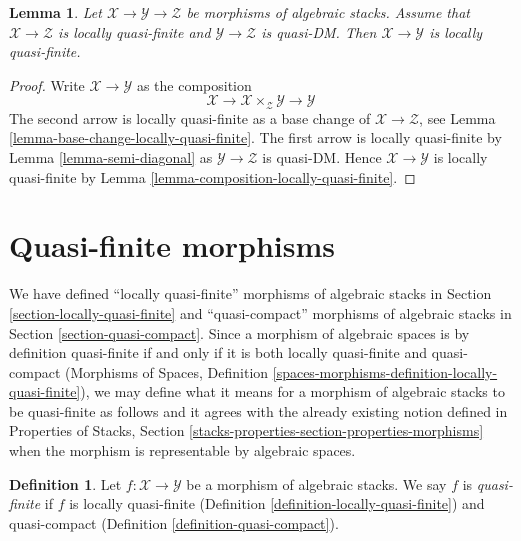 \documentclass{stacks-project}
\newenvironment{reference}{\comment}{\endcomment}
\theoremstyle{plain}
\newtheorem{lemma}[subsection]{Lemma}
\theoremstyle{definition}
\newtheorem{definition}[subsection]{Definition}
\theoremstyle{remark}
\numberwithin{equation}{subsection}
\begin{document}
\begin{lemma}
\label{lemma-locally-quasi-finite-permanence}
Let $\mathcal{X} \to \mathcal{Y} \to \mathcal{Z}$ be morphisms
of algebraic stacks. Assume that $\mathcal{X} \to \mathcal{Z}$
is locally quasi-finite and $\mathcal{Y} \to \mathcal{Z}$ is quasi-DM.
Then $\mathcal{X} \to \mathcal{Y}$ is locally quasi-finite.
\end{lemma}

\begin{proof}
Write $\mathcal{X} \to \mathcal{Y}$ as the composition
$$
\mathcal{X} \longrightarrow
\mathcal{X} \times_\mathcal{Z} \mathcal{Y} \longrightarrow
\mathcal{Y}
$$
The second arrow is locally quasi-finite as a base change of
$\mathcal{X} \to \mathcal{Z}$, see
Lemma \ref{lemma-base-change-locally-quasi-finite}.
The first arrow is locally quasi-finite by
Lemma \ref{lemma-semi-diagonal}
as $\mathcal{Y} \to \mathcal{Z}$ is quasi-DM.
Hence $\mathcal{X} \to \mathcal{Y}$ is locally quasi-finite by
Lemma \ref{lemma-composition-locally-quasi-finite}.
\end{proof}

















\section{Quasi-finite morphisms}
\label{section-quasi-finite}

\noindent
We have defined ``locally quasi-finite'' morphisms of algebraic stacks
in Section \ref{section-locally-quasi-finite} and ``quasi-compact'' morphisms
of algebraic stacks in Section \ref{section-quasi-compact}. Since a morphism
of algebraic spaces is by definition quasi-finite if and only if it is both
locally quasi-finite and quasi-compact (Morphisms of Spaces, Definition
\ref{spaces-morphisms-definition-locally-quasi-finite}),
we may define what it means for a morphism of algebraic stacks to be
quasi-finite as follows and it agrees with the already existing notion defined
in Properties of Stacks,
Section \ref{stacks-properties-section-properties-morphisms}
when the morphism is representable by algebraic spaces.

\begin{definition}
\label{definition-quasi-finite}
\begin{reference}
\cite{rydh_approx}
\end{reference}
Let $f : \mathcal{X} \to \mathcal{Y}$ be a morphism of algebraic stacks.
We say $f$ is {\it quasi-finite} if $f$ is locally quasi-finite
(Definition \ref{definition-locally-quasi-finite})
and quasi-compact (Definition \ref{definition-quasi-compact}).
\end{definition}
\end{document}
